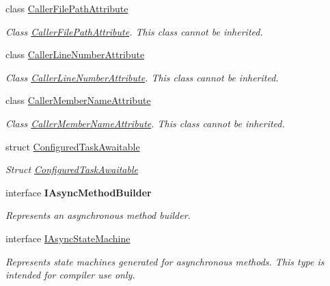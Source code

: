 \begin{DoxyCompactItemize}
class \hyperlink{class_system_1_1_runtime_1_1_compiler_services_1_1_caller_file_path_attribute}{Caller\+File\+Path\+Attribute}
\begin{DoxyCompactList}\small\item\em Class \hyperlink{class_system_1_1_runtime_1_1_compiler_services_1_1_caller_file_path_attribute}{Caller\+File\+Path\+Attribute}. This class cannot be inherited. \end{DoxyCompactList}\item 
class \hyperlink{class_system_1_1_runtime_1_1_compiler_services_1_1_caller_line_number_attribute}{Caller\+Line\+Number\+Attribute}
\begin{DoxyCompactList}\small\item\em Class \hyperlink{class_system_1_1_runtime_1_1_compiler_services_1_1_caller_line_number_attribute}{Caller\+Line\+Number\+Attribute}. This class cannot be inherited. \end{DoxyCompactList}\item 
class \hyperlink{class_system_1_1_runtime_1_1_compiler_services_1_1_caller_member_name_attribute}{Caller\+Member\+Name\+Attribute}
\begin{DoxyCompactList}\small\item\em Class \hyperlink{class_system_1_1_runtime_1_1_compiler_services_1_1_caller_member_name_attribute}{Caller\+Member\+Name\+Attribute}. This class cannot be inherited. \end{DoxyCompactList}\item 
struct \hyperlink{struct_system_1_1_runtime_1_1_compiler_services_1_1_configured_task_awaitable}{Configured\+Task\+Awaitable}
\begin{DoxyCompactList}\small\item\em Struct \hyperlink{struct_system_1_1_runtime_1_1_compiler_services_1_1_configured_task_awaitable}{Configured\+Task\+Awaitable} \end{DoxyCompactList}\item 
interface {\bfseries I\+Async\+Method\+Builder}
\begin{DoxyCompactList}\small\item\em Represents an asynchronous method builder.\end{DoxyCompactList}\item 
interface \hyperlink{interface_system_1_1_runtime_1_1_compiler_services_1_1_i_async_state_machine}{I\+Async\+State\+Machine}
\begin{DoxyCompactList}\small\item\em Represents state machines generated for asynchronous methods. This type is intended for compiler use only. \end{DoxyCompactList}\item 

\end{DoxyCompactItemize}
